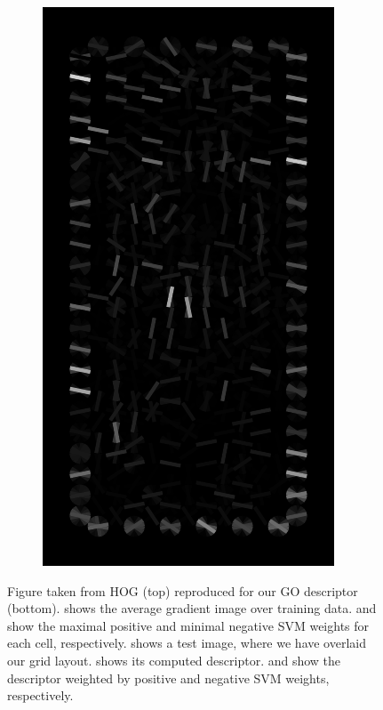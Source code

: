 \documentclass[thesis.tex]{subfiles}
\begin{document}
\begin{figure}
\begin{subfigure}[t]{0.135\textwidth}
		\includegraphics[width=\textwidth]{img/inriaExampleDescriptorSvmNeg.pdf}
		\caption{}
		\label{fig:inriaExampleDescriptorSvm}
		\vspace{2mm}
	\end{subfigure}
	\caption{Figure taken from HOG \citep{dalal2005histograms} (top) reproduced for our GO descriptor (bottom).  shows the average gradient image over training data.  and  show the maximal positive and minimal negative SVM weights for each cell, respectively.  shows a test image, where we have overlaid our grid layout.  shows its computed descriptor.  and  show the descriptor weighted by positive and negative SVM weights, respectively.}
	\label{fig:imageCorrespondenceCurves}
\end{figure}
\restoregeometry
\end{document}
